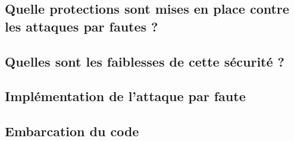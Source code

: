 \subsection{Quelle protections sont mises en place contre les attaques par fautes ?}


\subsection{Quelles sont les faiblesses de cette sécurité ?}

\subsection{Implémentation de l'attaque par faute}

\subsection{Embarcation du code}
